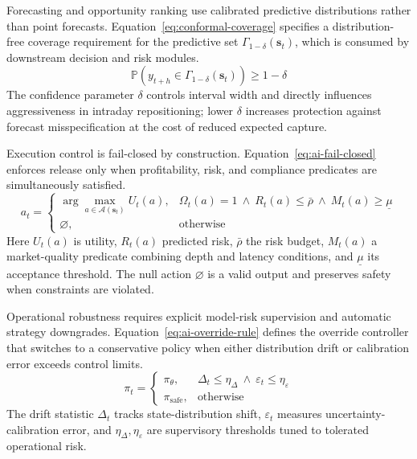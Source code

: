 \documentclass[oneside,10pt]{swissi}
\begin{document}
Forecasting and opportunity ranking use calibrated predictive distributions rather than point forecasts. Equation~\eqref{eq:conformal-coverage} specifies a distribution-free coverage requirement for the predictive set $\Gamma_{1-\delta}(\mathbf{s}_t)$, which is consumed by downstream decision and risk modules.
\begin{equation}
\mathbb{P}\!\left(y_{t+h}\in \Gamma_{1-\delta}(\mathbf{s}_t)\right)\ge 1-\delta
\label{eq:conformal-coverage}
\end{equation}
The confidence parameter $\delta$ controls interval width and directly influences aggressiveness in intraday repositioning; lower $\delta$ increases protection against forecast misspecification at the cost of reduced expected capture.\cite{angelopoulos_bates_2021_conformal,nord_pool_intraday_2026}

Execution control is fail-closed by construction. Equation~\eqref{eq:ai-fail-closed} enforces release only when profitability, risk, and compliance predicates are simultaneously satisfied.
\begin{equation}
a_t =
\begin{cases}
\arg\max\limits_{a\in\mathcal{A}(\mathbf{s}_t)} U_t(a), & \Omega_t(a)=1\ \land\ R_t(a)\le \bar{\rho}\ \land\ M_t(a)\ge \underline{\mu}\\
\varnothing, & \text{otherwise}
\end{cases}
\label{eq:ai-fail-closed}
\end{equation}
Here $U_t(a)$ is utility, $R_t(a)$ predicted risk, $\bar{\rho}$ the risk budget, $M_t(a)$ a market-quality predicate combining depth and latency conditions, and $\underline{\mu}$ its acceptance threshold. The null action $\varnothing$ is a valid output and preserves safety when constraints are violated.\cite{acer_market_coupling_development_2026,eu_reg_2011_1227_remit}

Operational robustness requires explicit model-risk supervision and automatic strategy downgrades. Equation~\eqref{eq:ai-override-rule} defines the override controller that switches to a conservative policy when either distribution drift or calibration error exceeds control limits.
\begin{equation}
\pi_t =
\begin{cases}
\pi_{\theta}, & \Delta_t \le \eta_{\Delta}\ \land\ \varepsilon_t \le \eta_{\varepsilon}\\
\pi_{\mathrm{safe}}, & \text{otherwise}
\end{cases}
\label{eq:ai-override-rule}
\end{equation}
The drift statistic $\Delta_t$ tracks state-distribution shift, $\varepsilon_t$ measures uncertainty-calibration error, and $\eta_{\Delta},\eta_{\varepsilon}$ are supervisory thresholds tuned to tolerated operational risk.\cite{nist_ai_rmf_2023,ec_network_codes_2026}
\end{document}
